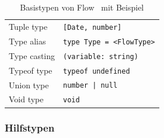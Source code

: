 \begin{table}[tbp]
\begin{tabularx}{\textwidth}{@{}ll@{}}
    Tuple type                 & \texttt{{[}Date, number{]}}              \\
    Type alias                 & \texttt{type Type = <{}FlowType>{}}      \\
    Type casting               & \texttt{(variable: string)}              \\
    Typeof type                & \texttt{typeof undefined}                \\
    Union type                 & \texttt{number | null}                   \\
    Void type                  & \texttt{void}                            \\
    \midrule
  \end{tabularx}
  \caption{Basistypen von Flow~\autocite{FLOW_TYPE_ANNOTATIONS} mit Beispiel}
  \label{tab:flow-base-types}
\end{table}

\subsubsection{Hilfstypen}

